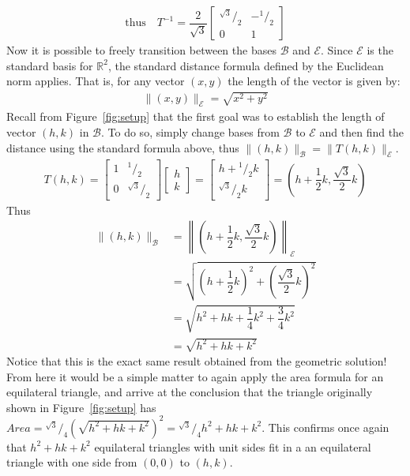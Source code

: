 \documentclass[12pt,letter]{article}
\newcommand*\rfrac[2]{{}^{#1}\!/_{#2}}
\begin{document}
%
\begin{align}
	\text{thus} \quad T^{-1} = \dfrac{2}{\sqrt{3}}
	\begin{bmatrix}
		\rfrac{\sqrt{3}}{2} & -\rfrac{1}{2} \\
		0 & 1
	\end{bmatrix}
	\label{eq:T_inv}
\end{align}
%
Now it is possible to freely transition between the bases $\mathcal{B}$ and $\mathcal{E}$. Since $\mathcal{E}$ is the standard basis for $\mathbb{R}^2$, the standard distance formula defined by the Euclidean norm applies. That is, for any vector $(x,y)$ the length of the vector is given by:
%
\begin{align*}
	\| (x,y) \|_\mathcal{E} = \sqrt{x^2 + y^2}
\end{align*}
%
Recall from Figure~\ref{fig:setup} that the first goal was to establish the length of vector $(h,k)$ in $\mathcal{B}$. To do so, simply change bases from $\mathcal{B}$ to $\mathcal{E}$ and then find the distance using the standard formula above, thus $\| (h, k) \|_\mathcal{B} = \| T(h,k) \|_\mathcal{E}$.
%
\begin{align*}
	T(h,k) =
	\begin{bmatrix}
		1 & \rfrac{1}{2}\\
		0 & \rfrac{\sqrt{3}}{2} 
	\end{bmatrix}
	\begin{bmatrix}
		h \\
		k
	\end{bmatrix}
	= \begin{bmatrix}
		h + \rfrac{1}{2} k \\
		\rfrac{\sqrt{3}}{2} k
	\end{bmatrix}
	= \left(h + \dfrac{1}{2} k , \dfrac{\sqrt{3}}{2} k \right)
\end{align*}
Thus
\begin{align*}
	\| (h, k) \|_\mathcal{B} &= \left\| \left(h + \dfrac{1}{2} k , \dfrac{\sqrt{3}}{2} k \right) \right\|_\mathcal{E} \\
	&= \sqrt{\left(h + \dfrac{1}{2} k \right)^2 + \left(\dfrac{\sqrt{3}}{2} k \right)^2} \\
	&= \sqrt{h^2 + hk + \dfrac 1 4 k^2 + \dfrac 3 4 k^2} \\
	&= \sqrt{h^2 + hk + k^2}
\end{align*}
%
Notice that this is the exact same result obtained from the geometric solution! From here it would be a simple matter to again apply the area formula for an equilateral triangle, and arrive at the conclusion that the triangle originally shown in Figure~\ref{fig:setup} has $Area = \rfrac{\sqrt{3}}{4}\left(\sqrt{h^2 + hk + k^2}\right)^2 = \rfrac{\sqrt{3}}{4}h^2 + hk + k^2$. This confirms once again that $h^2 +hk +k^2$ equilateral triangles with unit sides fit in a an equilateral triangle with one side from $(0,0)$ to $(h,k)$.
\end{document}
